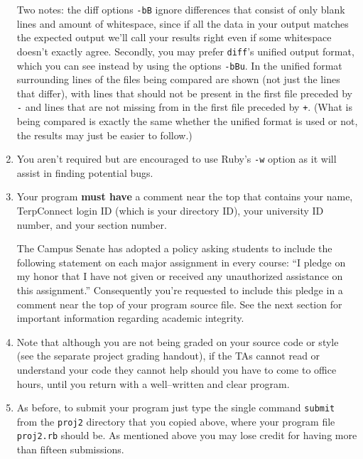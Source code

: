 \documentclass[11pt]{article}
\begin{document}
\begin{enumerate}
            Two notes: the diff options \texttt{-bB} ignore differences that
            consist of only blank lines and amount of whitespace, since if
            all the data in your output matches the expected output we'll
            call your results right even if some whitespace doesn't exactly
            agree.  Secondly, you may prefer \texttt{diff}'s unified output
            format, which you can see instead by using the options
            \texttt{-bBu}.  In the unified format surrounding lines of the
            files being compared are shown (not just the lines that differ),
            with lines that should not be present in the first file preceded
            by \texttt{-} and lines that are not missing from in the first
            file preceded by \texttt{+}.  (What is being compared is exactly
            the same whether the unified format is used or not, the results
            may just be easier to follow.)


      \item You aren't required but are encouraged to use Ruby's \texttt{-w}
            option as it will assist in finding potential bugs.

      \item Your program \textbf{must have} a comment near the top that
            contains your name, TerpConnect login ID (which is your
            directory ID), your university ID number, and your section
            number.

            The Campus Senate has adopted a policy asking students to
            include the following statement on each major assignment in
            every course: ``I pledge on my honor that I have not given or
            received any unauthorized assistance on this assignment.''
            Consequently you're requested to include this pledge in a
            comment near the top of your program source file.  See the next
            section for important information regarding academic integrity.

      \item Note that although you are not being graded on your source code
            or style (see the separate project grading handout), if the TAs
            cannot read or understand your code they cannot help should you
            have to come to office hours, until you return with a
            well--written and clear program.

      \item As before, to submit your program just type the single command
            \texttt{submit} from the \texttt{proj2} directory that you
            copied above, where your program file \texttt{proj2.rb} should
            be.  As mentioned above you may lose credit for having more than
            fifteen submissions.

    \end{enumerate}
\end{document}
